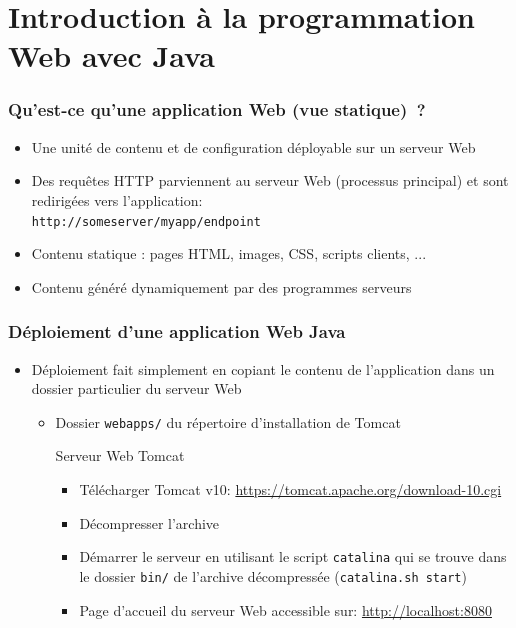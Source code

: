 \documentclass{beamer}
\begin{document}


\section{Introduction à la programmation Web avec Java}

\begin{frame}
	\frametitle{Qu'est-ce qu'une application Web (vue statique)~?}
	\begin{itemize}
		\item Une unité de contenu et de configuration déployable sur un serveur Web
		\item Des requêtes HTTP parviennent au serveur Web (processus principal) et sont redirigées
		vers l'application:\\
		\texttt{http://{\color{green}someserver}/{\color{red}myapp}/endpoint}
		\item Contenu statique : pages HTML, images, CSS, scripts clients, ...
		\item Contenu généré dynamiquement par des programmes serveurs
	\end{itemize}
\end{frame}

\begin{frame}
	\frametitle{Déploiement d'une application Web Java}
	\begin{itemize}
		\item Déploiement fait simplement en copiant le contenu de
		l'application dans un dossier particulier du serveur Web
		\begin{itemize}
			\item Dossier \texttt{webapps/} du répertoire d'installation de Tomcat
			\begin{block}{Serveur Web Tomcat}
				\begin{itemize}
					\item Télécharger Tomcat v10: \url{https://tomcat.apache.org/download-10.cgi}
					\item Décompresser l'archive
					\item Démarrer le serveur en utilisant le script
					\texttt{catalina} qui se trouve dans le dossier
					\texttt{bin/} de l'archive décompressée (\texttt{catalina.sh start})
					\item Page d'accueil du serveur Web accessible sur:
					\url{http://localhost:8080}
				\end{itemize}
			\end{block}
		\end{itemize}
	\end{itemize}
\end{frame}
\end{document}
